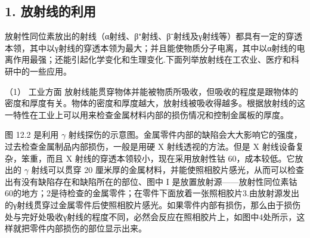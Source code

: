 \subsection{1. 放射线的利用}

放射性同位素放出的射线（α射线、β⁺射线、β⁻射线及γ射线等）都具有一定的穿透本领，其中以γ射线的穿透本领为最大；并且能使物质分子电离，其中以α射线的电离作用最强；还能引起化学变化和生理变化.下面列举放射线在工农业、医疗和科研中的一些应用。

（1） 工业方面
放射线能贯穿物体并能被物质所吸收，但吸收的程度是跟物体的密度和厚度有关。物体的密度和厚度越大，放射线被吸收得越多。根据放射线的这一特性在工业上可以用来检查金属材料内部的损伤情况和控制金属板的厚度。

图 12.2 是利用 \(\gamma\)
射线探伤的示意图。金属零件内部的缺陷会大大影响它的强度，过去检查金属制品内部损伤，一般是用硬
X 射线透视的方法。但是 X 射线设备复杂，笨重，而且 X
射线的穿透本领较小，现在采用放射性钴 60，成本较低。它放出的 \(\gamma\)
射线可以贯穿 20
厘米厚的金属材料，并能使照相胶片感光，从而可以检查出有没有缺陷存在和缺陷所在的部位、图中
I
是放置放射源------放射性同位素钴60的地方；2是待检查的金属零件；在零件下面放着一张照相胶片3.由放射源发出的γ射线贯穿过金属零件后使照相胶片感光。如果零件内部有损伤，那么由于损伤处与完好处吸收γ射线的程度不同，必然会反应在照相胶片上，如图中4处所示，这样就把零件内部损伤的部位显示出来。

